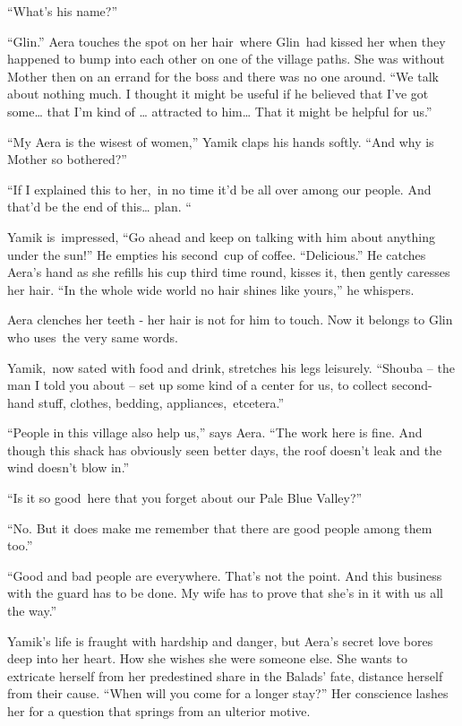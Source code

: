 \documentclass[twoside,11pt]{book}
\begin{document}
{}``What's his name?'' 

{}``Glin.'' Aera touches the spot on her hair~where Glin\ had kissed her when they happened to bump into each other on
one of the village paths. She was without Mother then on an errand for the boss and there was no one around. ``We talk
about nothing much. I thought it might be useful if he believed that I've got some{\dots}  that I'm kind of {\dots}
attracted to him{\dots} That it might be helpful for us.'' 

{}``My Aera is the wisest of women,'' Yamik claps his hands softly. ``And why is Mother so bothered?'' 

{}``If I explained this to her,\ in no time it'd be all over among our people. And that'd be the end of this{\dots}
plan. ``

Yamik is~impressed, ``Go ahead and keep on talking with him about anything under the sun!'' He empties his second~cup of
coffee. ``Delicious.'' He catches Aera's hand as she refills his cup third time round, kisses it, then gently caresses
her hair. {}``In the whole wide world no hair shines like yours,{}'' he whispers.

Aera clenches her teeth - her hair is not for him to touch. Now it belongs to Glin who uses\ the very same words.~ 

Yamik,\ now sated with food and drink, stretches his legs leisurely. ``Shouba -- the man I told you about -- set up some
kind of a center for us, to collect second-hand stuff, clothes, bedding, appliances,\ etcetera.'' 

{}``People in this village also help us,'' says Aera. ``The work here is fine. And though this shack has obviously seen
better days, the roof doesn't leak and the wind doesn't blow in.''

{}``Is it so good~here that you forget about our Pale Blue Valley?'' 

{}``No. But it does make me remember that there are good people among them too.'' 

{}``Good and bad people are everywhere. That's not the point. And this business with the guard has to be done. My wife
has to prove that she's in it with us all the way.''

Yamik's life is fraught with hardship and danger, but Aera's secret love bores deep into her heart. How she wishes she
were someone else. She wants to extricate herself from her predestined share in the Balads' fate, distance herself from
their cause. ``When will you come for a longer stay?'' Her conscience lashes her for a question that springs from an
ulterior motive. 
\end{document}
